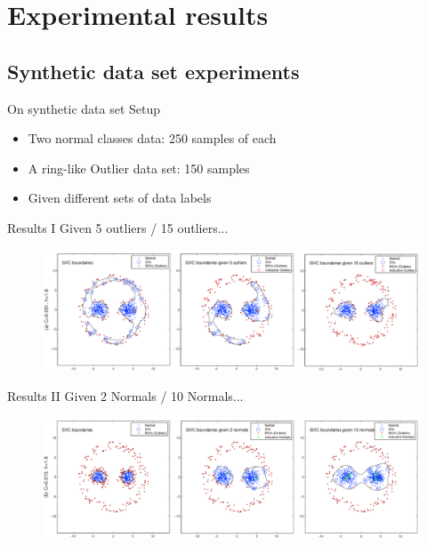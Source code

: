 \section{Experimental results}
\subsection{Synthetic data set experiments}
\begin{frame}{On synthetic data set}
Setup
\begin{itemize}
\item Two normal classes data: 250 samples of each
\item A ring-like Outlier data set: 150 samples
\item Given different sets of data labels
\end{itemize}
\end{frame}
\begin{frame}{Results I}
Given 5 outliers / 15 outliers...
\begin{figure}
\centering
\includegraphics[scale=0.28]{imgs/syn_01_01.pdf}\\
\end{figure}
\end{frame}
\begin{frame}{Results II}
Given 2 Normals / 10 Normals...
\begin{figure}
\centering
\includegraphics[scale=0.28]{imgs/syn_01_02.pdf}\\
\end{figure}
\end{frame}
